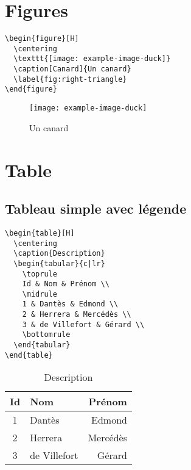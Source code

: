 \documentclass{article}
\begin{document}
\begin{multicols*}{3}
\section*{Figures}

\begin{multicols*}{2}


\begin{lstlisting}
\begin{figure}[H]
  \centering
  \texttt{[image: example-image-duck]}
  \caption[Canard]{Un canard}
  \label{fig:right-triangle}
\end{figure}
\end{lstlisting}

\begin{figure}[H]
    \centering
    \texttt{[image: example-image-duck]}
    \caption[Canard]{Un canard}
    \label{fig:right-triangle}
\end{figure}

\end{multicols*}

\section*{Table}
\subsection*{Tableau simple avec légende}
\begin{multicols*}{2}
\begin{lstlisting}
\begin{table}[H]
  \centering
  \caption{Description}
  \begin{tabular}{c|lr}
    \toprule
    Id & Nom & Prénom \\
    \midrule
    1 & Dantès & Edmond \\
    2 & Herrera & Mercédès \\
    3 & de Villefort & Gérard \\
    \bottomrule
  \end{tabular}
\end{table}
\end{lstlisting}
\columnbreak
\begin{table}[H]
  \centering
  \caption{Description}
  \begin{tabular}{c|lr}
    \toprule
    Id &  Nom & Prénom \\
    \midrule
    1 & Dantès & Edmond \\
    2 & Herrera & Mercédès \\
    3 & de Villefort & Gérard \\
    \bottomrule
  \end{tabular}
\end{table}
\end{multicols*}

\end{multicols*}
\end{document}
